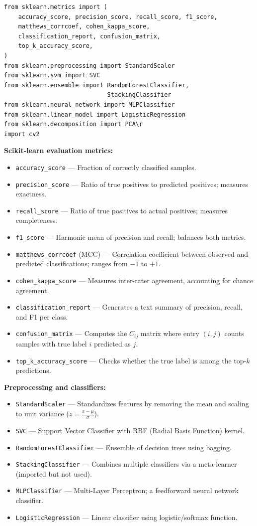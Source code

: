 \begin{lstlisting}
from sklearn.metrics import (
    accuracy_score, precision_score, recall_score, f1_score,
    matthews_corrcoef, cohen_kappa_score,
    classification_report, confusion_matrix,
    top_k_accuracy_score,
)
from sklearn.preprocessing import StandardScaler
from sklearn.svm import SVC
from sklearn.ensemble import RandomForestClassifier,
                             StackingClassifier
from sklearn.neural_network import MLPClassifier
from sklearn.linear_model import LogisticRegression
from sklearn.decomposition import PCA\r
import cv2
\end{lstlisting}

\begin{explanation}
\textbf{Scikit-learn evaluation metrics:}
\begin{itemize}[nosep]
  \item \texttt{accuracy\_score} --- Fraction of correctly classified samples.
  \item \texttt{precision\_score} --- Ratio of true positives to predicted positives; measures exactness.
  \item \texttt{recall\_score} --- Ratio of true positives to actual positives; measures completeness.
  \item \texttt{f1\_score} --- Harmonic mean of precision and recall; balances both metrics.
  \item \texttt{matthews\_corrcoef} (MCC) --- Correlation coefficient between observed and predicted classifications; ranges from $-1$ to $+1$.
  \item \texttt{cohen\_kappa\_score} --- Measures inter-rater agreement, accounting for chance agreement.
  \item \texttt{classification\_report} --- Generates a text summary of precision, recall, and F1 per class.
  \item \texttt{confusion\_matrix} --- Computes the $C_{ij}$ matrix where entry $(i,j)$ counts samples with true label $i$ predicted as $j$.
  \item \texttt{top\_k\_accuracy\_score} --- Checks whether the true label is among the top-$k$ predictions.
\end{itemize}

\textbf{Preprocessing and classifiers:}
\begin{itemize}[nosep]
  \item \texttt{StandardScaler} --- Standardizes features by removing the mean and scaling to unit variance ($z = \frac{x - \mu}{\sigma}$).
  \item \texttt{SVC} --- Support Vector Classifier with RBF (Radial Basis Function) kernel.
  \item \texttt{RandomForestClassifier} --- Ensemble of decision trees using bagging.
  \item \texttt{StackingClassifier} --- Combines multiple classifiers via a meta-learner (imported but not used).
  \item \texttt{MLPClassifier} --- Multi-Layer Perceptron; a feedforward neural network classifier.
  \item \texttt{LogisticRegression} --- Linear classifier using logistic/softmax function.


\end{itemize}
\end{explanation}
